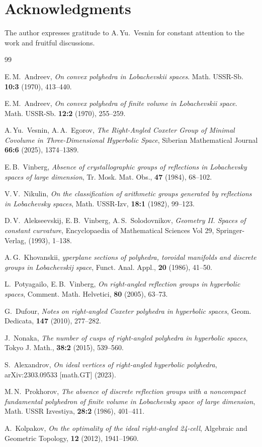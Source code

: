 \documentclass[12pt]{amsart}
\theoremstyle{definition}
\begin{document}
	\section*{Acknowledgments}
	The author expresses gratitude to A.\,Yu.~Vesnin for constant attention to the work and fruitful discussions.
	
	\begin{thebibliography}{99}
		
E.\,M.~Andreev, \textit{On convex polyhedra in Lobachevskii spaces}. Math. USSR-Sb. \textbf{10:3} (1970), 413--440.

E.\,M.~Andreev, \emph{On convex polyhedra of finite volume in Lobachevskii space}. Math. USSR-Sb. \textbf{12:2} (1970), 255--259. 

A.\,Yu.~Vesnin, A.\,A.~Egorov, \textit{The Right-Angled Coxeter Group of Minimal Covolume in Three-Dimensional Hyperbolic Space}, Siberian Mathematical Journal \textbf{66:6} (2025), 1374--1389.

E.\,B.~Vinberg, \textit{Absence of crystallographic groups of reflections in Lobachevsky spaces of large dimension}, Tr. Mosk. Mat. Obs., \textbf{47} (1984), 68--102.

V.\,V.~Nikulin, \textit{On the classification of arithmetic groups generated by reflections in Lobachevsky spaces}, Math. USSR-Izv, \textbf{18:1} (1982), 99--123.

D.\,V.~Alekseevskij, E.\,B.~Vinberg, A.\,S.~Solodovnikov, \textit{Geometry II. Spaces of constant curvature}, Encyclopaedia of Mathematical Sciences Vol 29, Springer-Verlag, (1993), 1--138.

A.\,G.~Khovanskii, \textit{yperplane sections of polyhedra, toroidal manifolds and discrete groups in Lobachevskij space}, Funct. Anal. Appl., \textbf{20} (1986), 41--50.

L.~Potyagailo, E.\,B.~Vinberg, \textit{On right-angled reflection groups in hyperbolic spaces}, Comment. Math. Helvetici, \textbf{80} (2005), 63--73.

G.~Dufour, \textit{Notes on right-angled Coxeter polyhedra in hyperbolic spaces}, Geom. Dedicata, \textbf{147} (2010), 277--282.

J.~Nonaka, \textit{The number of cusps of right-angled polyhedra in hyperbolic spaces}, Tokyo J. Math., \textbf{38:2} (2015), 539--560.

S.~Alexandrov, \textit{On ideal vertices of right-angled hyperbolic polyhedra}, arXiv:2303.09533 [math.GT] (2023).

M.\,N.~Prokhorov, \textit{The absence of discrete reflection groups with a noncompact fundamental polyhedron of finite volume in Lobachevsky space of large dimension}, Math. USSR Izvestiya, \textbf{28:2} (1986), 401--411.

A.~Kolpakov, \emph{On the optimality of the ideal right-angled 24-cell}, Algebraic and Geometric Topology, \textbf{12} (2012), 1941--1960.

		
	\end{thebibliography}
	
\end{document}
